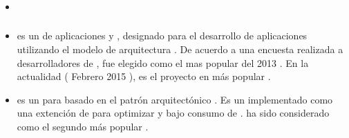 	\subsubsection{\frameworksPC}
		\begin{itemize}

			\item \textbf{\cakephpNAME}
			\item
				\textbf{\laravelNAME} es un \frameworkPC de aplicaciones \webINT \phpNAME \freePC y \openSourcePC, designado para el desarrollo de aplicaciones \webINT utilizando el modelo de arquitectura \mvcAS. De acuerdo a una encuesta realizada a desarrolladores de \phpNAME, \laravelNAME fue elegido como el \frameworkPC \phpNAME mas popular del 2013 \cite{online_sitepoint_best_php_frameworks_2014}. En la actualidad ( Febrero 2015 ), \laravelNAME es el proyecto \phpNAME en \gitHubNAME más popular \cite{online_popularity_php_proyects}.
			\item
				\textbf{\phalconNAME} es un \frameworkPC \webINT para \phpNAME \highPerformanceQA basado en el patrón arquitectónico \mvcAS. Es un \frameworkPC \openSourcePC implementado como una extención de \cNAME para optimizar \performanceQA y bajo consumo de \resourcesCPT \cite{online_technology_officialsite_phalcon}. \phalconNAME ha sido considerado como el segundo \frameworkPC \phpNAME más popular \cite{online_popularity_php_proyects}.


\end{itemize}
